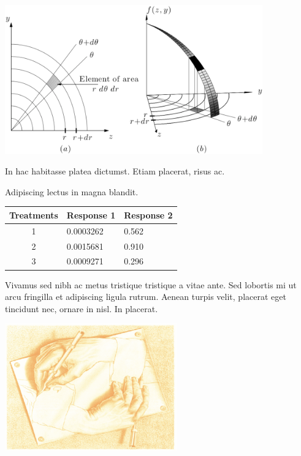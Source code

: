 \documentclass[12pt,a4paper]{article}\def\nCols{1}
\begin{document}
\begin{minipage}{\linewidth}\centering
\includegraphics[width=30em]{A1F_AreaElement}
\end{minipage}

In hac habitasse platea dictumst. Etiam placerat, risus ac.

Adipiscing lectus in magna blandit.

\begin{minipage}{\linewidth}\centering
{}
\begin{tabular}{cll}
\hline
{Treatments} & {Response 1} & {Response 2} \\
\hline
 1 & 0.0003262 & 0.562 \\
 2 & 0.0015681 & 0.910 \\
 3 & 0.0009271 & 0.296 \\
\hline
\end{tabular}
\end{minipage}

Vivamus sed nibh ac metus tristique tristique a vitae ante. Sed lobortis mi ut arcu fringilla et adipiscing ligula rutrum. Aenean turpis velit, placerat eget tincidunt nec, ornare in nisl. In placerat.

\begin{minipage}{\linewidth}\centering
\includegraphics[width=20em]{escher_hands}
\end{minipage}
\end{document}
